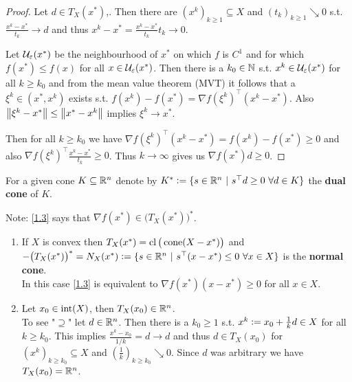 \begin{proof}
    Let \(d \in T_X(x^*)\),. Then there are \((x^k)_{k \ge 1} \subseteq X\) and \((t_k)_{k \ge 1} \searrow 0\) s.t. \(\frac{x^k - x^*}{t_k} \to d\) and thus \(x^k - x^* = \frac{x^k - x^*}{t_k} t_k \to 0\).

    Let \(\mathcal{U}_\varepsilon(x^*)\) be the neighbourhood of \(x^*\) on which \(f\) is \(C^1\) and for which \(f(x^*) \le f(x)\) for all \(x \in \mathcal{U}_\varepsilon(x^*)\). Then there is a \( k_0 \in \mathbb{N}\) s.t. \(x^k \in \mathcal{U}_\varepsilon(x^*)\) for all \(k \ge k_0\) and from the mean value theorem (MVT) it follows that a \(\xi^k \in (x^*, x^k)\) exists s.t. \(f(x^k) - f(x^*) = \nabla f(\xi^k)^\top (x^k - x^*)\). Also \(\left\| \xi^k - x^* \right\| \le \left\| x^* - x^k \right\|\) implies \(\xi^k \to x^*\).

    Then for all \(k \ge k_0\) we have \(\nabla f(\xi^k)^\top (x^k - x^*) = f(x^k) - f(x^*) \ge 0\) and also \(\nabla f(\xi^k)^\top \frac{x^k - x^*}{t_k} \ge 0\). Thus \(k \to \infty\) gives us \(\nabla f(x^*) d \ge 0\).
\end{proof}

\begin{definition}\label{def1.2}
    For a given cone \(K \subseteq \mathbb{R}^n\) denote by \(K^* \defeq \{s \in \R^n \ | \ s^\top d \ge 0 \ \forall d \in K\}\) the \textbf{dual cone} of \(K\).

    Note: \eqref{1.3} says that \(\nabla f(x^*) \in \big(T_X(x^*)\big)^*\).
\end{definition}

\begin{remark}\label{rem1.3}
    \begin{enumerate}
        \item If \(X\) is convex then \(T_X(x^*) = \operatorname{cl}\big(\operatorname{cone}(X - x^*)\big)\) and \(-\big(T_X(x^*)\big)^* = N_X(x^*) \mathrel{\mathop:}= \{ s \in \mathbb{R}^n \ | \ s^\top (x - x^*) \le 0 \ \forall x \in X \}\) is the \textbf{normal cone}. \\
        In this case \eqref{1.3} is equivalent to \(\nabla f(x^*) (x - x^*) \ge 0\) for all \(x \in X\).
        \item Let \(x_0 \in \operatorname{int}(X)\), then \(T_X(x_0) \in \mathbb{R}^n\). \\
        To see "\(\supseteq\)" let \(d \in \mathbb{R}^n\). Then there is a \(k_0 \ge 1\) s.t. \(x^k \mathrel{\mathop:}= x_0 + \frac{1}{k}d \in X\) for all \(k \ge k_0\). This implies \(\frac{x^k - x_0}{1/k} = d \to d\) and thus \(d \in T_X(x_0)\) for \((x^k)_{k \ge k_0} \subseteq X\) and \((\frac{1}{k})_{k \ge k_0} \searrow 0\). Since \(d\) was arbitrary we have \(T_X(x_0) = \mathbb{R}^n\).
    \end{enumerate}
\end{remark}

